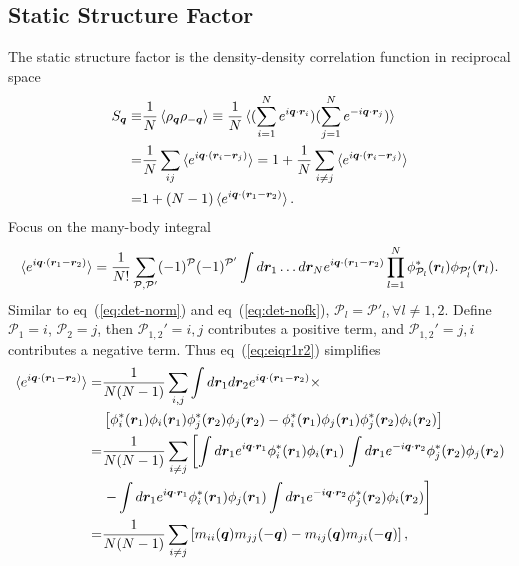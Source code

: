 \subsection{Static Structure Factor}
\label{sec:wf-pw-sdet-sk}
The static structure factor is the density-density correlation function in reciprocal space
\begin{align}
S_{\boldsymbol{q}} \equiv& \frac{1}{N}\braket{\rho_{\boldsymbol{q}}\rho_{-\boldsymbol{q}}} \equiv
\frac{1}{N}\braket{
(\sum\limits_{i=1}^N e^{i\boldsymbol{q}\cdot\boldsymbol{r}_i})
(\sum\limits_{j=1}^N e^{-i\boldsymbol{q}\cdot\boldsymbol{r}_j})
} \nonumber \\
=& \frac{1}{N}\sum_{ij}\braket{e^{i\boldsymbol{q}\cdot(\boldsymbol{r}_i-\boldsymbol{r}_j)}} =
1 + \frac{1}{N}\sum_{i\neq j}\braket{e^{i\boldsymbol{q}\cdot(\boldsymbol{r}_i-\boldsymbol{r}_j)}} \nonumber \\
=& 1+(N-1)\braket{e^{i\boldsymbol{q}\cdot(\boldsymbol{r}_1-\boldsymbol{r}_2)}}.
\end{align}
Focus on the many-body integral
\begin{align}
\braket{e^{i\boldsymbol{q}\cdot(\boldsymbol{r}_1-\boldsymbol{r}_2)}} = \dfrac{1}{N!} \sum\limits_{\mathcal{P},\mathcal{P'}} 
(-1)^{\mathcal{P}} (-1)^{\mathcal{P'}} \int d\boldsymbol{r}_1\dots d\boldsymbol{r}_N
e^{i\boldsymbol{q}\cdot(\boldsymbol{r}_1-\boldsymbol{r}_2)}
\prod\limits_{l=1}^{N} \phi^*_{\mathcal{P}_l}(\boldsymbol{r}_l)\phi_{\mathcal{P}_l'}(\boldsymbol{r}_l). \label{eq:eiqr1r2}
\end{align}
Similar to eq~(\ref{eq:det-norm}) and eq~(\ref{eq:det-nofk}), $\mathcal{P}_l=\mathcal{P}'_l, \forall l\neq1, 2$. Define $\mathcal{P}_1=i$, $\mathcal{P}_2=j$, then $\mathcal{P}_{1,2}'=i, j$ contributes a positive term, and $\mathcal{P}_{1,2}'=j, i$ contributes a negative term. Thus eq~(\ref{eq:eiqr1r2}) simplifies
\begin{align}
\braket{e^{i\boldsymbol{q}\cdot(\boldsymbol{r}_1-\boldsymbol{r}_2)}} =& \dfrac{1}{N(N-1)} \sum\limits_{i, j}
 \int d\boldsymbol{r}_1d\boldsymbol{r}_2
e^{i\boldsymbol{q}\cdot(\boldsymbol{r}_1-\boldsymbol{r}_2)} \times \nonumber \\
&\left[
\phi^*_{i}(\boldsymbol{r}_1)\phi_{i}(\boldsymbol{r}_1)\phi^*_{j}(\boldsymbol{r}_2)\phi_{j}(\boldsymbol{r}_2) - 
\phi^*_{i}(\boldsymbol{r}_1)\phi_{j}(\boldsymbol{r}_1)\phi^*_{j}(\boldsymbol{r}_2)\phi_{i}(\boldsymbol{r}_2)
\right] \nonumber \\
=& \dfrac{1}{N(N-1)} \sum\limits_{i\neq j} \left[
\int d\boldsymbol{r}_1 e^{i\boldsymbol{q}\cdot\boldsymbol{r}_1} \phi^*_{i}(\boldsymbol{r}_1)\phi_{i}(\boldsymbol{r}_1) \right.
\int d\boldsymbol{r}_1 e^{-i\boldsymbol{q}\cdot\boldsymbol{r}_2} \phi^*_{j}(\boldsymbol{r}_2)\phi_{j}(\boldsymbol{r}_2) \nonumber \\
& \left. - \int d\boldsymbol{r}_1 e^{i\boldsymbol{q}\cdot\boldsymbol{r}_1} \phi^*_{i}(\boldsymbol{r}_1)\phi_{j}(\boldsymbol{r}_1)
\int d\boldsymbol{r}_1 e^{-i\boldsymbol{q}\cdot\boldsymbol{r}_2} \phi^*_{j}(\boldsymbol{r}_2)\phi_{i}(\boldsymbol{r}_2)
\right] \nonumber \\
=& \dfrac{1}{N(N-1)} \sum\limits_{i\neq j} \left[
m_{ii}(\boldsymbol{q})m_{jj}(-\boldsymbol{q}) - m_{ij}(\boldsymbol{q})m_{ji}(-\boldsymbol{q})
\right],
\end{align}
